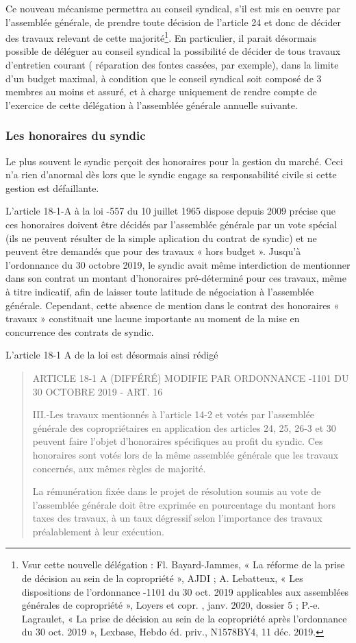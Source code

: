 			Ce nouveau mécanisme permettra au conseil syndical, s’il est mis en oeuvre par l’assemblée générale, de prendre toute décision de l’article 24 et donc de décider des travaux relevant de cette majorité\footnote{V\degres sur cette nouvelle délégation : Fl. Bayard-Jammes, « La réforme de la prise de décision au sein de la copropriété », AJDI ; A. Lebatteux, « Les dispositions de l’ordonnance -1101 du 30 oct. 2019 applicables aux assemblées générales de copropriété », Loyers et copr. , janv. 2020, dossier 5 ; P.-e. Lagraulet, « La prise de décision au sein de la copropriété après l’ordonnance du 30 oct. 2019 », Lexbase, Hebdo éd. priv., N1578BY4, 11 déc. 2019.}. En particulier, il parait désormais possible de déléguer au conseil syndical la possibilité de décider de tous travaux d’entretien courant ( réparation des fontes cassées, par exemple), dans la limite d’un budget maximal, à condition que le conseil syndical soit composé de 3 membres au moins et assuré, et à charge uniquement de rendre compte de l’exercice de cette délégation à l’assemblée générale annuelle suivante.
		
		\subsubsection{Les honoraires du syndic}
		
			Le plus souvent le syndic perçoit des honoraires pour la gestion du marché. Ceci n'a rien d'anormal dès lors que le syndic engage sa responsabilité civile si cette gestion est défaillante.
			
			L’article 18-1-A à la loi -557 du 10 juillet 1965 dispose depuis 2009 précise que ces honoraires doivent être décidés par l’assemblée générale par un vote spécial (ils ne peuvent résulter de la simple aplication du contrat de syndic) et ne peuvent être demandés que pour des travaux « hors budget ». Jusqu’à l’ordonnance du 30 octobre 2019, le syndic avait même interdiction de mentionner dans son contrat un montant d’honoraires pré-déterminé pour ces travaux, même à titre indicatif, afin de laisser toute latitude de négociation à l’assemblée générale. Cependant, cette absence de mention dans le contrat des honoraires « travaux » constituait une lacune importante au moment de la mise en concurrence des contrats de syndic.
			
			L’article 18-1 A de la loi est désormais ainsi rédigé
			\begin{quote}
				ARTICLE 18-1 A (DIFFÉRÉ) MODIFIE PAR ORDONNANCE -1101 DU 30 OCTOBRE 2019 - ART. 16
				
				III.-Les travaux mentionnés à l'article 14-2 et votés par l'assemblée générale des copropriétaires en application des articles 24, 25, 26-3 et 30 peuvent faire l'objet d'honoraires spécifiques au profit du syndic. Ces honoraires sont votés lors de la même assemblée générale que les travaux concernés, aux mêmes règles de majorité.
				
				La rémunération fixée dans le projet de résolution soumis au vote de l'assemblée générale doit être exprimée en pourcentage du montant hors taxes des travaux, à un taux dégressif selon l'importance des travaux préalablement à leur exécution.
			\end{quote}

